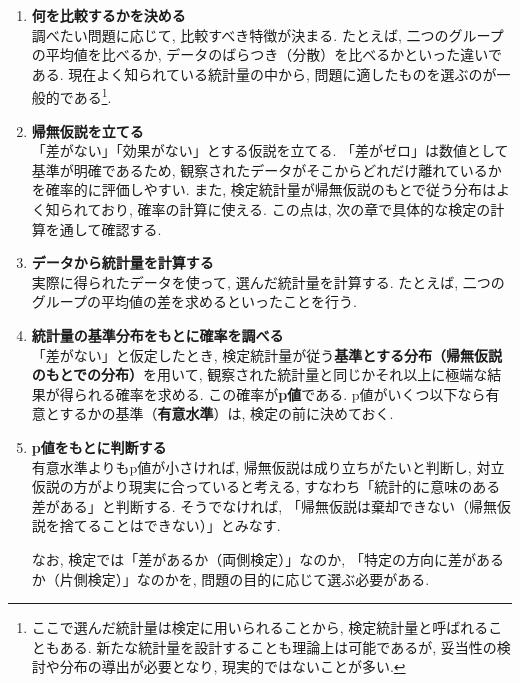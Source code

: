     \begin{enumerate}
      \item \textbf{何を比較するかを決める} \\
        調べたい問題に応じて, 比較すべき特徴が決まる.
        たとえば, 二つのグループの平均値を比べるか,
        データのばらつき（分散）を比べるかといった違いである.
        現在よく知られている統計量の中から,
        問題に適したものを選ぶのが一般的である\footnote{
          ここで選んだ統計量は検定に用いられることから, 検定統計量と呼ばれることもある.
          新たな統計量を設計することも理論上は可能であるが,
          妥当性の検討や分布の導出が必要となり, 現実的ではないことが多い.}.

      \item \textbf{帰無仮説を立てる} \\
        「差がない」「効果がない」とする仮説を立てる.
        「差がゼロ」は数値として基準が明確であるため,
        観察されたデータがそこからどれだけ離れているかを確率的に評価しやすい.
        また, 検定統計量が帰無仮説のもとで従う分布はよく知られており,
        確率の計算に使える.
        この点は, 次の章で具体的な検定の計算を通して確認する.

      \item \textbf{データから統計量を計算する} \\
        実際に得られたデータを使って, 選んだ統計量を計算する.
        たとえば, 二つのグループの平均値の差を求めるといったことを行う.

      \item \textbf{統計量の基準分布をもとに確率を調べる} \\
        「差がない」と仮定したとき, 検定統計量が従う\textbf{基準とする分布（帰無仮説のもとでの分布）}を用いて,
        観察された統計量と同じかそれ以上に極端な結果が得られる確率を求める.
        この確率が\textbf{p値}である.
        p値がいくつ以下なら有意とするかの基準（\textbf{有意水準}）は, 検定の前に決めておく.

      \item \textbf{p値をもとに判断する} \\
        有意水準よりもp値が小さければ,
        帰無仮説は成り立ちがたいと判断し, 対立仮説の方がより現実に合っていると考える,
        すなわち「統計的に意味のある差がある」と判断する.
        そうでなければ, 「帰無仮説は棄却できない（帰無仮説を捨てることはできない）」とみなす.

        なお, 検定では「差があるか（両側検定）」なのか,
        「特定の方向に差があるか（片側検定）」なのかを,
        問題の目的に応じて選ぶ必要がある.
    \end{enumerate}


